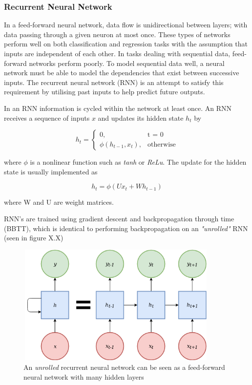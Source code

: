 \subsubsection{Recurrent Neural Network}
In a feed-forward neural network, data flow is unidirectional between layers; with data passing through a given neuron at most once. These types of networks perform well on both classification and regression tasks with the assumption that inputs are independent of each other. In tasks dealing with sequential data, feed-forward networks perform poorly. To model sequential data well, a neural network must be able to model the dependencies that exist between successive inputs. The recurrent neural network (RNN) is an attempt to satisfy this requirement by utilising past inputs to help predict future outputs.
\par
\noindent
\newline
In an RNN information is cycled within the network at least once.  An RNN receives a sequence of inputs \(x\) and updates its hidden state \(h_{t}\) by 

\begin{equation}
	h_{t}=
	\begin{cases}
	 0, & \text{t = 0} \\
	 \phi{(h_{t-1}, x_{t})}, & \text{otherwise}
	\end{cases}
\end{equation}

\noindent
where $\phi$ is a nonlinear function such as \textit{tanh} or \textit{ReLu}. The update for the hidden state is usually implemented as 

\begin{equation}
h_{t} = \phi{(Ux_{t} + Wh_{t-1})}
\end{equation}

\noindent
where W and U are weight matrices.

\par
\noindent
\newline
RNN's are trained using gradient descent and backpropagation through time (BBTT), which is identical to performing backpropagation on an \textit{"unrolled"} RNN (seen in figure X.X)

\begin{figure}[h]
	\includegraphics[width=10cm, height=6cm]{./figures/fig3}
	\centering
	\caption{An \textit{unrolled} recurrent neural network can be seen as a feed-forward neural network with many hidden layers}
	\label{fig:fig3}
\end{figure}

